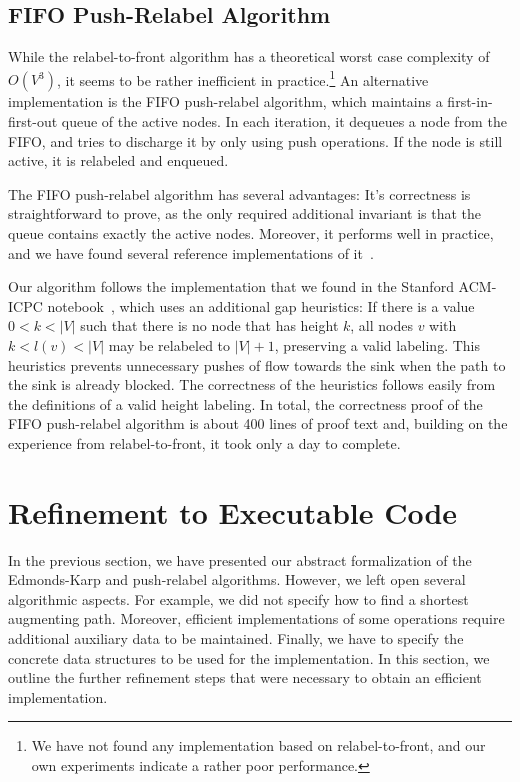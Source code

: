 \documentclass[smallcondensed]{svjour3}     %
\begin{document}
\subsection{FIFO Push-Relabel Algorithm}
While the relabel-to-front algorithm has a theoretical worst case complexity of $O(V^3)$, it seems to be rather inefficient in practice.\footnote{We have not found any implementation based on relabel-to-front, and our own experiments indicate a rather poor performance.}
An alternative implementation is the FIFO push-relabel algorithm, which maintains a first-in-first-out queue of the active nodes. 
In each iteration, it dequeues a node from the FIFO, and tries to discharge it by only using push operations.
If the node is still active, it is relabeled and enqueued.


The FIFO push-relabel algorithm has several advantages: It's correctness is straightforward to prove, 
as the only required additional invariant is that the queue contains exactly the active nodes. 
Moreover, it performs well in practice, and we have found several reference implementations of it~\cite{ChGo97,ICPC-notebook}.

Our algorithm follows the implementation that we found in the Stanford ACM-ICPC notebook~\cite{ICPC-notebook}, 
which uses an additional gap heuristics: If there is a value $0<k<|V|$ such that there is no node that has height $k$, 
all nodes $v$ with $k<l(v)<|V|$ may be relabeled to $|V|+1$, preserving a valid labeling. 
This heuristics prevents unnecessary pushes of flow towards the sink when the path to the sink is already blocked.
The correctness of the heuristics follows easily from the definitions of a valid height labeling.
In total, the correctness proof of the FIFO push-relabel algorithm is about 400 lines of proof text and, building on the experience from relabel-to-front, it 
took only a day to complete.

  
    
\section{Refinement to Executable Code}\label{sec:executable}
  In the previous section, we have presented our abstract formalization of the Edmonds-Karp and push-relabel algorithms.
  However, we left open several algorithmic aspects. For example, we did not specify how to find a shortest augmenting path.
  Moreover, efficient implementations of some operations require additional auxiliary data to be maintained. 
  Finally, we have to specify the concrete data structures to be used for the implementation. 
  In this section, we outline the further refinement steps that were necessary to obtain an efficient implementation.
\end{document}
